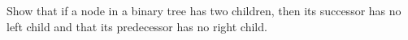 Show that if a node in a binary tree has two children, then its
successor has no left child and that its predecessor has no right
child.
